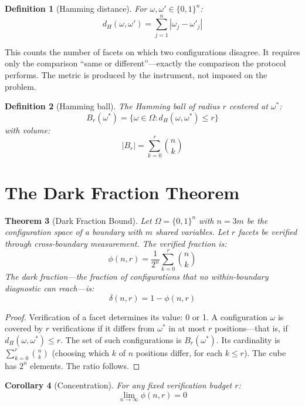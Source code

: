 \documentclass[11pt,a4paper]{article}
\newtheorem{theorem}{Theorem}
\newtheorem{corollary}[theorem]{Corollary}
\newtheorem{definition}[theorem]{Definition}
\begin{document}
\begin{definition}[Hamming distance]
For $\omega, \omega' \in \{0,1\}^n$:
\[
d_H(\omega, \omega') = \sum_{j=1}^{n} |\omega_j - \omega'_j|
\]
\end{definition}

\noindent This counts the number of facets on which two configurations disagree. It requires only the comparison ``same or different''---exactly the comparison the protocol performs. The metric is produced by the instrument, not imposed on the problem.

\begin{definition}[Hamming ball]
The Hamming ball of radius $r$ centered at $\omega^*$:
\[
B_r(\omega^*) = \{\omega \in \Omega : d_H(\omega, \omega^*) \leq r\}
\]
with volume:
\[
|B_r| = \sum_{k=0}^{r} \binom{n}{k}
\]
\end{definition}

\section{The Dark Fraction Theorem}
\label{sec:theorem}

\begin{theorem}[Dark Fraction Bound]
\label{thm:main}
Let $\Omega = \{0,1\}^n$ with $n = 3m$ be the configuration space of a boundary with $m$ shared variables. Let $r$ facets be verified through cross-boundary measurement. The verified fraction is:
\[
\phi(n, r) = \frac{1}{2^n} \sum_{k=0}^{r} \binom{n}{k}
\]
The dark fraction---the fraction of configurations that no within-boundary diagnostic can reach---is:
\[
\delta(n, r) = 1 - \phi(n, r)
\]
\end{theorem}

\begin{proof}
Verification of a facet determines its value: 0 or 1. A configuration $\omega$ is covered by $r$ verifications if it differs from $\omega^*$ in at most $r$ positions---that is, if $d_H(\omega, \omega^*) \leq r$. The set of such configurations is $B_r(\omega^*)$. Its cardinality is $\sum_{k=0}^{r}\binom{n}{k}$ (choosing which $k$ of $n$ positions differ, for each $k \leq r$). The cube has $2^n$ elements. The ratio follows.
\end{proof}

\begin{corollary}[Concentration]
\label{cor:conc}
For any fixed verification budget $r$:
\[
\lim_{n \to \infty} \phi(n, r) = 0
\]
\end{corollary}
\end{document}
